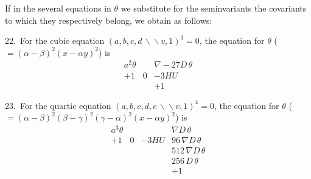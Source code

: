 \documentclass[11pt,a4paper]{book}
\begin{document}
If in the several equations in $\theta$ we substitute for the seminvariants the covariants to which they respectively belong, we obtain as follows:

22.\ For the cubic equation $(a,b,c,d\,\backslash\!\!\backslash v, 1)^3=0$, the equation for $\theta$ ($=(\alpha-\beta)^2(x-\alpha y)^2$) is
\[
\begin{array}{ccc}
a^2\theta & & \nabla-27D\,\theta\\
+1 & 0 & -3HU\\
& & +1
\end{array}
\]

23.\ For the quartic equation $(a,b,c,d,e\,\backslash\!\!\backslash v, 1)^4=0$, the equation for $\theta$ ($=(\alpha-\beta)^2(\beta-\gamma)^2(\gamma-\alpha)^2(x-\alpha y)^2$) is
\[
\begin{array}{cccc}
a^3\theta & & & \nabla D\,\theta\\
+1 & 0 & -3HU & 96\,\nabla D\,\theta\\
& & & 512\,\nabla D\,\theta\\
& & & 256\,D\,\theta\\
& & & +1
\end{array}
\]

\newpage
\setcounter{page}{308}
\end{document}
